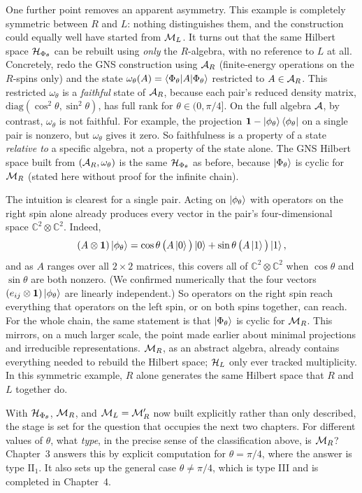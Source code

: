 One further point removes an apparent asymmetry. This example is completely symmetric between $R$ and $L$:
nothing distinguishes them, and the construction could equally well have started from $\mathcal{M}_L$. It turns out
that the same Hilbert space $\mathcal{H}_{\Phi_\theta}$ can be rebuilt using \emph{only} the $R$-algebra, with no
reference to $L$ at all. Concretely, redo the GNS construction using $\mathcal{A}_R$ (finite-energy operations on
the $R$-spins only) and the state $\omega_\theta(A)=\braket{\Phi_\theta|A|\Phi_\theta}$ restricted to
$A\in\mathcal{A}_R$. This restricted $\omega_\theta$ is a \emph{faithful} state of $\mathcal{A}_R$, because each pair's
reduced density matrix, $\mathrm{diag}(\cos^2\theta,\sin^2\theta)$, has full rank for $\theta\in(0,\pi/4]$. On
the full algebra $\mathcal{A}$, by contrast, $\omega_\theta$ is not faithful. For example, the projection
$\mathbf{1}-\ket{\phi_\theta}\bra{\phi_\theta}$ on a single pair is nonzero, but $\omega_\theta$ gives it zero. So
faithfulness is a property of a state \emph{relative to} a specific algebra, not a property of the state
alone. The GNS Hilbert space built from $(\mathcal{A}_R,\omega_\theta)$ is the same $\mathcal{H}_{\Phi_\theta}$ as before,
because $\ket{\Phi_\theta}$ is cyclic for $\mathcal{M}_R$ (stated here without proof for the infinite chain).

The intuition is clearest for a single pair. Acting on $\ket{\phi_\theta}$ with operators on the right spin
alone already produces every vector in the pair's four-dimensional space $\mathbb C^2\otimes\mathbb C^2$.
Indeed,
\[
(A\otimes\mathbf{1})\ket{\phi_\theta}=\cos\theta\,\big(A\ket0\big)\ket0+\sin\theta\,\big(A\ket1\big)\ket1 ,
\]
and as $A$ ranges over all $2\times2$ matrices, this covers all of $\mathbb C^2\otimes\mathbb C^2$ when
$\cos\theta$ and $\sin\theta$ are both nonzero. (We confirmed numerically that the four vectors
$(e_{ij}\otimes\mathbf{1})\ket{\phi_\theta}$ are linearly independent.) So operators on the right spin reach
everything that operators on the left spin, or on both spins together, can reach. For the whole chain, the
same statement is that $\ket{\Phi_\theta}$ is cyclic for $\mathcal{M}_R$. This mirrors, on a much larger scale, the
point made earlier about minimal projections and irreducible representations. $\mathcal{M}_R$, as an abstract
algebra, already contains everything needed to rebuild the Hilbert space; $\mathcal{H}_L$ only ever tracked
multiplicity. In this symmetric example, $R$ alone generates the same Hilbert space that $R$ and $L$ together
do.

With $\mathcal{H}_{\Phi_\theta}$, $\mathcal{M}_R$, and $\mathcal{M}_L=\mathcal{M}_R'$ now built explicitly rather than only described, the stage is
set for the question that occupies the next two chapters. For different values of $\theta$, what
\emph{type}, in the precise sense of the classification above, is $\mathcal{M}_R$? Chapter~3 answers this by explicit
computation for $\theta=\pi/4$, where the answer is type $\mathrm{II}_1$. It also sets up the general case
$\theta\ne\pi/4$, which is type III and is completed in Chapter~4.
